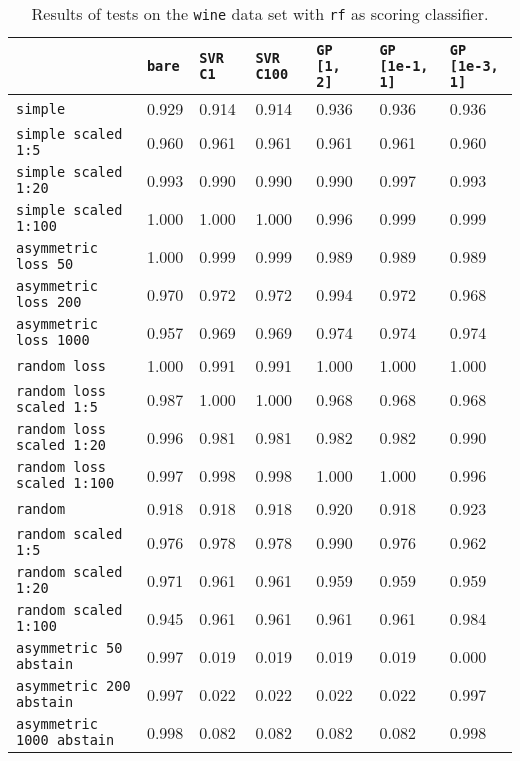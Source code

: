 \begin{table}
{\scriptsize
\begin{tabu}{l|l|l|l|l|l|l}
&\texttt{bare} &\texttt{SVR C1} &\texttt{SVR C100} &\texttt{GP [1, 2]} &\texttt{GP [1e-1, 1]} &\texttt{GP [1e-3, 1]}  \\
\hline
\texttt{simple} &0.929 &0.914 &0.914 &0.936 &0.936 &0.936 \\
\texttt{simple scaled 1:5} &0.960 &0.961 &0.961 &0.961 &0.961 &0.960 \\
\texttt{simple scaled 1:20} &0.993 &0.990 &0.990 &0.990 &0.997 &0.993 \\
\texttt{simple scaled 1:100} &1.000 &1.000 &1.000 &0.996 &0.999 &0.999 \\
\texttt{asymmetric loss 50} &1.000 &0.999 &0.999 &0.989 &0.989 &0.989 \\
\texttt{asymmetric loss 200} &0.970 &0.972 &0.972 &0.994 &0.972 &0.968 \\
\texttt{asymmetric loss 1000} &0.957 &0.969 &0.969 &0.974 &0.974 &0.974 \\
\texttt{random loss} &1.000 &0.991 &0.991 &1.000 &1.000 &1.000 \\
\texttt{random loss scaled 1:5} &0.987 &1.000 &1.000 &0.968 &0.968 &0.968 \\
\texttt{random loss scaled 1:20} &0.996 &0.981 &0.981 &0.982 &0.982 &0.990 \\
\texttt{random loss scaled 1:100} &0.997 &0.998 &0.998 &1.000 &1.000 &0.996 \\
\texttt{random} &0.918 &0.918 &0.918 &0.920 &0.918 &0.923 \\
\texttt{random scaled 1:5} &0.976 &0.978 &0.978 &0.990 &0.976 &0.962 \\
\texttt{random scaled 1:20} &0.971 &0.961 &0.961 &0.959 &0.959 &0.959 \\
\texttt{random scaled 1:100} &0.945 &0.961 &0.961 &0.961 &0.961 &0.984 \\
\texttt{asymmetric 50 abstain} &0.997 &0.019 &0.019 &0.019 &0.019 &0.000 \\
\texttt{asymmetric 200 abstain} &0.997 &0.022 &0.022 &0.022 &0.022 &0.997 \\
\texttt{asymmetric 1000 abstain} &0.998 &0.082 &0.082 &0.082 &0.082 &0.998 \\
\end{tabu} }
\caption{Results of tests on the \texttt{wine} data set
         with \texttt{rf} as scoring classifier.}
\end{table}
